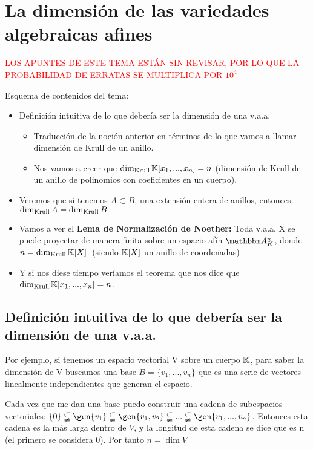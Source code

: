 
\chapter{La dimensión de las variedades algebraicas afines}

\textcolor{red}{LOS APUNTES DE ESTE TEMA ESTÁN SIN REVISAR, POR LO QUE LA PROBABILIDAD DE ERRATAS SE MULTIPLICA POR $10^4$}


Esquema de contenidos del tema:

\begin{itemize}
	\item Definición intuitiva de lo que debería ser la dimensión de una v.a.a.
	\begin{itemize}
		\item Traducción de la noción anterior en términos de lo que vamos a llamar dimensión de Krull de un anillo.
		\item Nos vamos a creer que $\dim_{\mathrm{Krull}}\mathbb{K}[x_1,...,x_n]=n$ (dimensión de Krull de un anillo de polinomios con coeficientes en un cuerpo).
	\end{itemize}
	\item Veremos que si tenemos $A \subset B$, una extensión entera de anillos, entonces $ \dim_{\mathrm{Krull}} A = \dim_{\mathrm{Krull}} B$
	\item Vamos a ver el \textbf{Lema de Normalización de Noether:} Toda v.a.a. X se puede proyectar de manera finita sobre un espacio afín $\Akn$, donde $n=\dim_{\mathrm{Krull}}\mathbb{K}[X]$. (siendo $\mathbb{K}[X]$ un anillo de coordenadas) %
	\item Y si nos diese tiempo veríamos el teorema que nos dice que $\dim_{\mathrm{Krull}}\mathbb{K}[x_1,...,x_n]=n$.
\end{itemize}

\section{Definición intuitiva de lo que debería ser la dimensión de una v.a.a.}

Por ejemplo, si tenemos un espacio vectorial V sobre un cuerpo $\mathbb{K}$, para saber la dimensión de V buscamos una base $B=\{ v_1,...,v_n\}$ que es una serie de vectores linealmente independientes que generan el espacio.

Cada vez que me dan una base puedo construir una cadena de subespacios vectoriales:
$\{0\} \subsetneqq \gen{v_1} \subsetneqq \gen{v_1,v_2} \subsetneqq ... \subsetneqq \gen{v_1,...,v_n}$. Entonces esta cadena es la más larga dentro de $V$, y la longitud de esta cadena se dice que es n (el primero se considera 0). Por tanto $n= \dim V$

